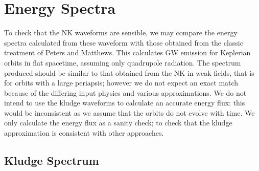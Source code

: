 \section{Energy Spectra}

To check that the NK waveforms are sensible, we may compare the energy spectra calculated from these waveform with those obtained from the classic treatment of Peters and Matthews\cite{Peters1963, Peters1964}. This calculates GW emission for Keplerian orbits in flat spacetime, assuming only quadrupole radiation. The spectrum produced should be similar to that obtained from the NK in weak fields, that is for orbits with a large periapsis; however we do not expect an exact match because of the differing input physics and various approximations.  We do not intend to use the kludge waveforms to calculate an accurate energy flux: this would be inconsistent as we assume that the orbits do not evolve with time. We only calculate the energy flux as a sanity check; to check that the kludge approximation is consistent with other approaches.

\subsection{Kludge Spectrum}

